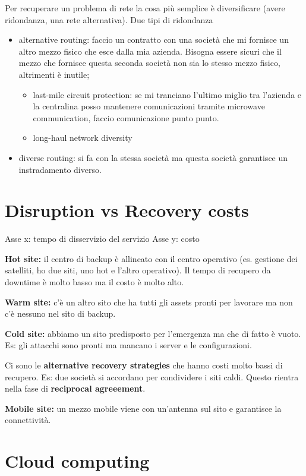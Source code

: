 Per recuperare un problema di rete la cosa più semplice è diversificare (avere 
ridondanza, una rete alternativa). Due tipi di ridondanza
\begin{itemize}
\item alternative routing: faccio un contratto con una società che mi fornisce 
un altro mezzo fisico che esce dalla mia azienda. Bisogna essere sicuri che il 
mezzo che fornisce questa seconda società non sia lo stesso mezzo fisico, 
altrimenti è inutile;
\begin{itemize}
\item last-mile circuit protection: se mi tranciano l'ultimo miglio tra 
l'azienda e la centralina posso mantenere comunicazioni tramite microwave 
communication, faccio comunicazione punto punto.
\item long-haul network diversity
\end{itemize}
\item diverse routing: si fa con la stessa società ma questa società garantisce 
un instradamento diverso.
\end{itemize}

\section{Disruption vs Recovery costs}


Asse x: tempo di disservizio del servizio
Asse y: costo

\textbf{Hot site:} il centro di backup è allineato con il centro operativo (es. 
gestione dei satelliti, ho due siti, uno hot e l'altro operativo). Il tempo di 
recupero da downtime è molto basso ma il costo è molto alto.

\textbf{Warm site:} c'è un altro sito che ha tutti gli assets pronti per 
lavorare ma non c'è nessuno nel sito di backup.

\textbf{Cold site:} abbiamo un sito predisposto per l'emergenza ma che di fatto 
è vuoto. Es: gli attacchi sono pronti ma mancano i server e le configurazioni.

Ci sono le \textbf{alternative recovery strategies} che hanno costi molto bassi 
di recupero. Es: due società si accordano per condividere i siti caldi. Questo 
rientra nella fase di \textbf{reciprocal agreeement}.

\textbf{Mobile site:} un mezzo mobile viene con un'antenna sul sito e 
garantisce la connettività.

\section{Cloud computing}

